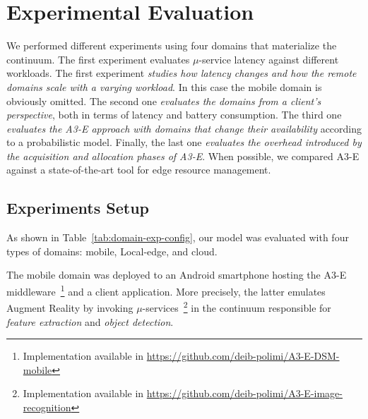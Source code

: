 
\section{Experimental Evaluation}\label{sec:evaluation}

We performed different experiments using four domains that materialize the continuum. The first experiment evaluates $\mu$-service latency against different workloads. The first experiment \emph{studies how latency changes and how the remote domains scale with a varying workload}. In this case the mobile domain is obviously omitted. The second one \emph{evaluates the domains from a client's perspective}, both in terms of latency and battery consumption. The third one \emph{evaluates the A3-E approach with domains that change their availability} according to a probabilistic model. Finally, the last one \emph{evaluates the overhead introduced by the acquisition and allocation phases of A3-E}. When possible, we compared A3-E against a state-of-the-art tool for edge resource management.

\subsection{Experiments Setup}


As shown in Table~\ref{tab:domain-exp-config}, our model was evaluated with four types of domains: mobile, Local-edge, and cloud. 

The mobile domain was deployed to an Android smartphone hosting the A3-E middleware~\footnote{Implementation available in \url{https://github.com/deib-polimi/A3-E-DSM-mobile}} and a client application. More precisely, the latter emulates Augment Reality by invoking
$\mu$-services~\footnote{Implementation available in \url{https://github.com/deib-polimi/A3-E-image-recognition}} in the continuum responsible for \textit{feature extraction} and \textit{object detection}. 

